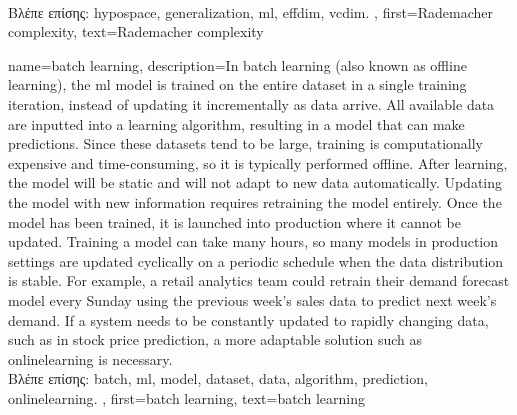 {{%
		\\
		\foreignlanguage{greek}{Βλέπε επίσης:} \gls{hypospace}, \gls{generalization}, \gls{ml}, \gls{effdim}, \gls{vcdim}. },
	first={Rademacher complexity},
	text={Rademacher complexity}  
}

{name={batch learning},
	description={In \gls{batch} learning (also known as offline learning), the \gls{ml} \gls{model} 
		is trained on the entire \gls{dataset} in a single training iteration, instead of updating it incrementally as \gls{data} arrive. 
		All available \gls{data} are inputted into a learning \gls{algorithm}, resulting in a \gls{model} that can make \gls{prediction}s. 
		Since these \gls{dataset}s tend to be large, training is computationally expensive and time-consuming, 
		so it is typically performed offline. After learning, the \gls{model} will be static and will not adapt to new \gls{data} automatically. 
		Updating the \gls{model} with new information requires retraining the \gls{model} entirely. Once the \gls{model} has been trained, 
		it is launched into production where it cannot be updated. Training a \gls{model} can take many hours, so many \gls{model}s in production 
		settings are updated cyclically on a periodic schedule when the \gls{data} distribution is stable. For example, a retail analytics team 
		could retrain their demand forecast \gls{model} every Sunday using the previous week's sales \gls{data} to predict next week's demand. 
		If a system needs to be constantly updated to rapidly changing \gls{data}, such as in stock price \gls{prediction}, a more adaptable solution 
		such as \gls{onlinelearning} is necessary.
		\\
		\foreignlanguage{greek}{Βλέπε επίσης:} \gls{batch}, \gls{ml}, \gls{model}, \gls{dataset}, \gls{data}, \gls{algorithm}, \gls{prediction}, 
		\gls{onlinelearning}. },
	first={batch learning}, 
	text={batch learning}
}




